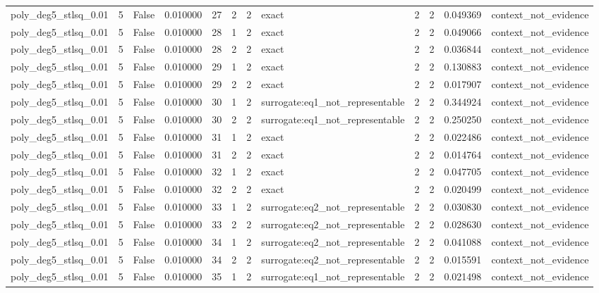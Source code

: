 \begin{tabular}{lrrrrrrlrrrl}
poly\_deg5\_stlsq\_0.01 & 5 & False & 0.010000 & 27 & 2 & 2 & exact & 2 & 2 & 0.049369 & context\_not\_evidence \\
poly\_deg5\_stlsq\_0.01 & 5 & False & 0.010000 & 28 & 1 & 2 & exact & 2 & 2 & 0.049066 & context\_not\_evidence \\
poly\_deg5\_stlsq\_0.01 & 5 & False & 0.010000 & 28 & 2 & 2 & exact & 2 & 2 & 0.036844 & context\_not\_evidence \\
poly\_deg5\_stlsq\_0.01 & 5 & False & 0.010000 & 29 & 1 & 2 & exact & 2 & 2 & 0.130883 & context\_not\_evidence \\
poly\_deg5\_stlsq\_0.01 & 5 & False & 0.010000 & 29 & 2 & 2 & exact & 2 & 2 & 0.017907 & context\_not\_evidence \\
poly\_deg5\_stlsq\_0.01 & 5 & False & 0.010000 & 30 & 1 & 2 & surrogate:eq1\_not\_representable & 2 & 2 & 0.344924 & context\_not\_evidence \\
poly\_deg5\_stlsq\_0.01 & 5 & False & 0.010000 & 30 & 2 & 2 & surrogate:eq1\_not\_representable & 2 & 2 & 0.250250 & context\_not\_evidence \\
poly\_deg5\_stlsq\_0.01 & 5 & False & 0.010000 & 31 & 1 & 2 & exact & 2 & 2 & 0.022486 & context\_not\_evidence \\
poly\_deg5\_stlsq\_0.01 & 5 & False & 0.010000 & 31 & 2 & 2 & exact & 2 & 2 & 0.014764 & context\_not\_evidence \\
poly\_deg5\_stlsq\_0.01 & 5 & False & 0.010000 & 32 & 1 & 2 & exact & 2 & 2 & 0.047705 & context\_not\_evidence \\
poly\_deg5\_stlsq\_0.01 & 5 & False & 0.010000 & 32 & 2 & 2 & exact & 2 & 2 & 0.020499 & context\_not\_evidence \\
poly\_deg5\_stlsq\_0.01 & 5 & False & 0.010000 & 33 & 1 & 2 & surrogate:eq2\_not\_representable & 2 & 2 & 0.030830 & context\_not\_evidence \\
poly\_deg5\_stlsq\_0.01 & 5 & False & 0.010000 & 33 & 2 & 2 & surrogate:eq2\_not\_representable & 2 & 2 & 0.028630 & context\_not\_evidence \\
poly\_deg5\_stlsq\_0.01 & 5 & False & 0.010000 & 34 & 1 & 2 & surrogate:eq2\_not\_representable & 2 & 2 & 0.041088 & context\_not\_evidence \\
poly\_deg5\_stlsq\_0.01 & 5 & False & 0.010000 & 34 & 2 & 2 & surrogate:eq2\_not\_representable & 2 & 2 & 0.015591 & context\_not\_evidence \\
poly\_deg5\_stlsq\_0.01 & 5 & False & 0.010000 & 35 & 1 & 2 & surrogate:eq1\_not\_representable & 2 & 2 & 0.021498 & context\_not\_evidence \\

\end{tabular}
